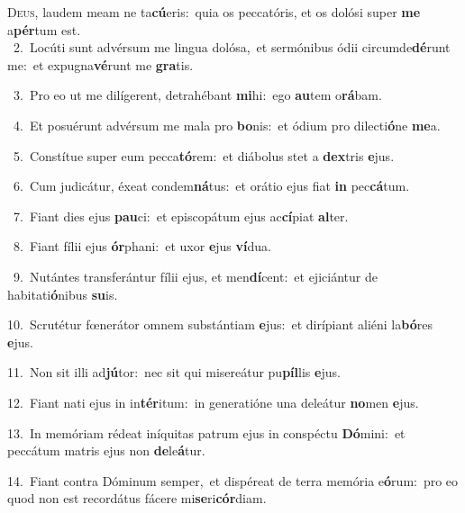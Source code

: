 \lettrine{\initial\textcolor{\initialcolor}{D}}{eus,} laudem meam ne ta\-\textbf{cú}\-eris:~\star quia os peccatóris, et os dolósi super \textbf{me} a\-\textbf{pér}\-tum est.\\
{\numbfont\textcolor{\numbcolor}{~2.}}~Locúti sunt advérsum me lingua dolósa,~\dagger et sermónibus ódii circumde\-\textbf{dé}\-runt me:~\star et expugna\-\textbf{vé}\-runt me \textbf{gra}\-tis.\par
{\numbfont\textcolor{\numbcolor}{~3.}}~Pro eo ut me dilígerent, detrahébant \textbf{mi}\-hi:~\star ego \textbf{au}\-tem o\-\textbf{rá}\-bam.\par
{\numbfont\textcolor{\numbcolor}{~4.}}~Et posuérunt advérsum me mala pro \textbf{bo}\-nis:~\star et ódium pro dilecti\-\textbf{ó}\-ne \textbf{me}\-a.\par
{\numbfont\textcolor{\numbcolor}{~5.}}~Constítue super eum pecca\-\textbf{tó}\-rem:~\star et diábolus stet a \textbf{dex}\-tris \textbf{e}\-jus.\par
{\numbfont\textcolor{\numbcolor}{~6.}}~Cum judicátur, éxeat condem\-\textbf{ná}\-tus:~\star et orátio ejus fiat \textbf{in} pec\-\textbf{cá}\-tum.\par
{\numbfont\textcolor{\numbcolor}{~7.}}~Fiant dies ejus \textbf{pau}\-ci:~\star et episcopátum ejus ac\-\textbf{cí}\-piat \textbf{al}\-ter.\par
{\numbfont\textcolor{\numbcolor}{~8.}}~Fiant fílii ejus \textbf{ór}\-phani:~\star et uxor \textbf{e}\-jus \textbf{ví}\-dua.\par
{\numbfont\textcolor{\numbcolor}{~9.}}~Nutántes transferántur fílii ejus, et men\-\textbf{dí}\-cent:~\star et ejiciántur de habitati\-\textbf{ó}\-nibus \textbf{su}\-is.\par
{\numbfont\textcolor{\numbcolor}{10.}}~Scrutétur fœnerátor omnem substántiam \textbf{e}\-jus:~\star et dirípiant aliéni la\-\textbf{bó}\-res \textbf{e}\-jus.\par
{\numbfont\textcolor{\numbcolor}{11.}}~Non sit illi ad\-\textbf{jú}\-tor:~\star nec sit qui misereátur pu\-\textbf{píl}\-lis \textbf{e}\-jus.\par
{\numbfont\textcolor{\numbcolor}{12.}}~Fiant nati ejus in in\-\textbf{tér}\-itum:~\star in generatióne una deleátur \textbf{no}\-men \textbf{e}\-jus.\par
{\numbfont\textcolor{\numbcolor}{13.}}~In memóriam rédeat iníquitas patrum ejus in conspéctu \textbf{Dó}\-mini:~\star et peccátum matris ejus non \textbf{de}\-le\-\textbf{á}\-tur.\par
{\numbfont\textcolor{\numbcolor}{14.}}~Fiant contra Dóminum semper,~\dagger et dispéreat de terra memória e\-\textbf{ó}\-rum:~\star pro eo quod non est recordátus fácere mi\-\textbf{se}\-ri\-\textbf{cór}\-diam.\par
